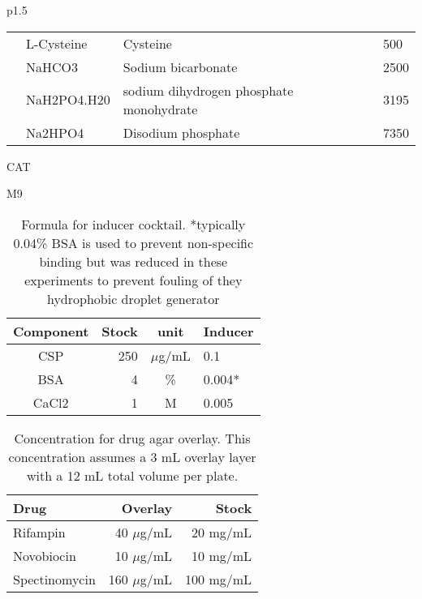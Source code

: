{\begin{tabular}{p{}}
\begin{tabular}{llll}
		& L-Cysteine                          & Cysteine                                & 500                  \\
		& NaHCO3                              & Sodium bicarbonate                      & 2500                 \\
		& NaH2PO4.H20                         & sodium dihydrogen phosphate monohydrate & 3195                 \\
		& Na2HPO4                             & Disodium phosphate                      & 7350                
	\end{tabular}
\end{tabular}
}

CAT

M9

\begin{table}[]
	\centering
	\caption{Formula for inducer cocktail. *typically 0.04\% BSA is used to prevent non-specific binding but was reduced in these experiments to prevent fouling of they hydrophobic droplet generator}
	\label{table_csp}
	\begin{tabular}{crcl}
		\hline
		Component & Stock & unit  & Inducer \\ \hline
		CSP       & 250   & $\mu$g/mL & 0.1     \\
		BSA       & 4     & \%    & 0.004*  \\
		CaCl2     & 1     & M     & 0.005   \\
	\end{tabular}
\end{table}

\begin{table}[]
	\centering
	\caption{Concentration for drug agar overlay. This concentration assumes a 3 mL overlay layer with a 12 mL total volume per plate.}
	\label{table_drug-agar}
	\begin{tabular}{lrr}
		\hline
		Drug          & Overlay   & Stock     \\ \hline
		Rifampin      & 40 $\mu$g/mL  & 20 mg/mL  \\
		Novobiocin    & 10 $\mu$g/mL  & 10 mg/mL  \\
		Spectinomycin & 160 $\mu$g/mL & 100 mg/mL
	\end{tabular}
\end{table}